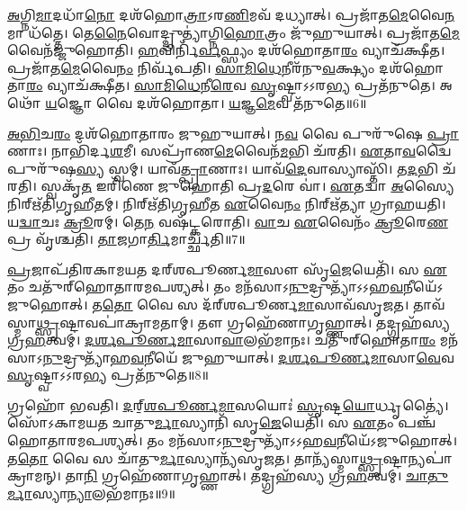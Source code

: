 \-\ul{𑌅}\-𑌗𑍍𑌨𑌿\-\ul{𑌮𑌾}\-𑌦𑌧𑌾᳴\-\ul{𑌨𑍋} 𑌦𑌶᳴𑌹𑍋\-\ul{𑌤𑍍𑌰𑌾}\-\-𑌽𑌰\-\ul{𑌣𑌿}\-𑌮𑌵᳴ 𑌦𑌧𑍍𑌯𑌾𑌤𑍍।
𑌪𑍍𑌰𑌜𑌾᳴𑌤\-\ul{𑌮𑍇}\-𑌵𑍈\-\ul{𑌨}\-𑌮𑌾 𑌧᳴𑌤𑍍𑌤𑍇।
𑌤𑍇\-\ul{𑌨𑍈}\-𑌵𑍋𑌦𑍍𑌦𑍍𑌰𑍁𑌤𑍍𑌯𑌾॑𑌗𑍍𑌨𑌿\-\ul{𑌹𑍋}\-𑌤𑍍𑌰𑌂 𑌜𑍁᳴𑌹𑍁𑌯𑌾𑌤𑍍।
𑌪𑍍𑌰𑌜𑌾᳴𑌤\-\ul{𑌮𑍇}\-𑌵𑍈𑌨᳴𑌜𑍍𑌜𑍁𑌹𑍋𑌤𑌿।
\-\ul{𑌹}\-𑌵𑌿𑌰𑍍𑌨𑌿᳴\-\ul{𑌰𑍍𑌵}\-𑌫𑍍𑌸𑍍𑌯𑌂 𑌦𑌶᳴𑌹𑍋𑌤𑌾\-\ul{𑌰𑌂} 𑌵𑍍𑌯𑌾𑌚᳴𑌕𑍍𑌷𑍀𑌤।
𑌪𑍍𑌰𑌜𑌾᳴𑌤\-\ul{𑌮𑍇}\-𑌵𑍈\-\ul{𑌨𑌂} 𑌨𑌿𑌰𑍍𑌵᳴𑌪𑌤𑌿।
\-\ul{𑌸𑌾}\-\-\ul{𑌮𑌿}\-\-\ul{𑌧𑍇}\-𑌨𑍀𑌰᳴𑌨𑍁\-\ul{𑌵}\-𑌕𑍍𑌷𑍍𑌯𑌂 𑌦𑌶᳴𑌹𑍋𑌤𑌾\-\ul{𑌰𑌂} 𑌵𑍍𑌯𑌾𑌚᳴𑌕𑍍𑌷𑍀𑌤।
\-\ul{𑌸𑌾}\-\-\ul{𑌮𑌿}\-\-\ul{𑌧𑍇}\-𑌨𑍀\-\ul{𑌰𑍇}\-𑌵 \ul{𑌸𑍃}\-𑌷𑍍𑌟𑍍𑌵𑌾\-𑌽𑌽𑌰\-\ul{𑌭𑍍𑌯} 𑌪𑍍𑌰𑌤᳴𑌨𑍁𑌤𑍇।
𑌅𑌥𑍋᳴ \ul{𑌯}\-𑌜𑍍𑌞𑍋 𑌵𑍈 𑌦𑌶᳴𑌹𑍋𑌤𑌾।
\-\ul{𑌯}\-𑌜𑍍𑌞\-\ul{𑌮𑍇}\-𑌵 𑌤᳴𑌨𑍁𑌤𑍇॥6॥

\-\ul{𑌅}\-\-\ul{𑌭𑌿}\-𑌚\-\ul{𑌰𑌂} 𑌦𑌶᳴𑌹𑍋𑌤𑌾𑌰𑌂 𑌜𑍁𑌹𑍁𑌯𑌾𑌤𑍍।
𑌨\-\ul{𑌵} 𑌵𑍈 𑌪𑍁𑌰𑍁᳴𑌷𑍇 \ul{𑌪𑍍𑌰𑌾}\-𑌣𑌾𑌃।
𑌨𑌾𑌭𑌿᳴𑌰𑍍𑌦\-\ul{𑌶}\-𑌮𑍀।
𑌸𑌪𑍍𑌰𑌾᳴𑌣\-\ul{𑌮𑍇}\-𑌵𑍈𑌨᳴\-\ul{𑌮}\-𑌭𑌿 𑌚᳴𑌰𑌤𑌿।
\-\ul{𑌏}\-𑌤𑌾\-\ul{𑌵}\-𑌦𑍍𑌵𑍈 𑌪𑍁𑌰𑍁᳴𑌷\-\ul{𑌸𑍍𑌯} 𑌸𑍍𑌵𑌮𑍍।
𑌯𑌾𑌵᳴\-\ul{𑌤𑍍𑌪𑍍𑌰𑌾}\-𑌣𑌾𑌃।
𑌯𑌾𑌵᳴\-\ul{𑌦𑍇}\-𑌵𑌾𑌸𑍍𑌯𑌾𑌸𑍍𑌤𑌿᳴।
𑌤\-\ul{𑌦}\-𑌭𑌿 𑌚᳴𑌰𑌤𑌿।
𑌸𑍍𑌵𑌕𑍃᳴\-\ul{𑌤} 𑌇𑌰𑌿᳴𑌣𑍇 𑌜𑍁𑌹𑍋𑌤𑌿 𑌪𑍍𑌰\-\ul{𑌦}\-𑌰𑍇 𑌵𑌾॑।
\-\ul{𑌏}\-𑌤𑌦𑍍𑌵𑌾 \ul{𑌅}\-𑌸𑍍𑌯𑍈 𑌨𑌿𑌰𑍍‌\mbox{}𑌋᳴𑌤𑌿𑌗𑍃𑌹𑍀𑌤𑌮𑍍।
𑌨𑌿𑌰𑍍‌\mbox{}𑌋᳴𑌤𑌿𑌗𑍃𑌹𑍀𑌤 \ul{𑌏}\-𑌵𑍈\-\ul{𑌨𑌂} 𑌨𑌿𑌰𑍍‌\mbox{}𑌋᳴𑌤𑍍𑌯𑌾 𑌗𑍍𑌰𑌾𑌹𑌯𑌤𑌿।
𑌯\-\ul{𑌦𑍍𑌵𑌾}\-𑌚𑌃 \ul{𑌕𑍍𑌰𑍂}\-𑌰𑌮𑍍।
𑌤𑍇\-\ul{𑌨} 𑌵𑌷᳴𑌟𑍍𑌕𑌰𑍋𑌤𑌿।
\-\ul{𑌵𑌾}\-𑌚 \ul{𑌏}\-𑌵𑍈𑌨𑌂᳴ \ul{𑌕𑍍𑌰𑍂}\-𑌰𑍇\-\ul{𑌣} 𑌪𑍍𑌰 𑌵𑍃᳴𑌶𑍍𑌚𑌤𑌿।
\-\ul{𑌤𑌾}\-𑌜𑌗𑌾\-\ul{𑌰𑍍𑌤𑌿}\-𑌮𑌾𑌰𑍍𑌚𑍍𑌛᳴𑌤𑌿॥7॥\anuvakamend[𑌦𑌶᳴𑌹𑍋\-\ul{𑌤𑌾} 𑌸𑍃𑌷𑍍𑌟𑍍𑌯𑌾᳴ \ul{𑌋}\-𑌚𑍍𑌛𑍇𑌦𑍍𑌵𑍍𑌯𑌾𑌚᳴𑌪𑍍𑌟𑍇 𑌰𑍁𑌨𑍍𑌧 \ul{𑌏}\-𑌵 𑌤᳴𑌨𑍁\-\ul{𑌤𑍇} 𑌨𑌿𑌰𑍍‌\mbox{}𑌋᳴𑌤𑌿𑌗𑍃𑌹𑍀\-\ul{𑌤𑌂} 𑌪𑌞𑍍𑌚᳴ 𑌚]

\-\ul{𑌪𑍍𑌰}\-𑌜𑌾𑌪᳴𑌤𑌿𑌰𑌕𑌾𑌮𑌯𑌤 𑌦𑌰𑍍‌\mbox{}𑌶𑌪𑍂𑌰𑍍𑌣\-\ul{𑌮𑌾}\-𑌸𑍗 𑌸𑍃᳴\-\ul{𑌜𑍇}\-𑌯𑍇𑌤𑌿᳴।
𑌸 \ul{𑌏}\-𑌤𑌂  𑌚𑌤𑍁᳴𑌰𑍍‌\mbox{}𑌹𑍋𑌤𑌾𑌰𑌮𑌪𑌶𑍍𑌯𑌤𑍍।
𑌤𑌂 𑌮𑌨᳴𑌸𑌾\-𑌽\-\ul{𑌨𑍁}\-𑌦𑍍𑌰𑍁𑌤𑍍𑌯𑌾᳴\-𑌽𑌽𑌹\-\ul{𑌵}\-𑌨𑍀𑌯𑍇᳴\-𑌽𑌜𑍁𑌹𑍋𑌤𑍍।
𑌤\-\ul{𑌤𑍋} 𑌵𑍈 𑌸 𑌦᳴𑌰𑍍‌\mbox{}𑌶𑌪𑍂𑌰𑍍𑌣\-\ul{𑌮𑌾}\-𑌸𑌾𑌵᳴\-𑌸𑍃𑌜𑌤।
𑌤𑌾𑌵᳴𑌸𑍍𑌮𑌾\-\ul{𑌥𑍍𑌸𑍃}\-𑌷𑍍𑌟𑌾𑌵𑌪𑌾॑\-𑌕𑍍𑌰𑌾𑌮𑌤𑌾𑌮𑍍।
𑌤𑍗 𑌗𑍍𑌰𑌹𑍇᳴𑌣𑌾𑌗𑍃𑌹𑍍𑌣𑌾𑌤𑍍।
𑌤𑌦𑍍𑌗𑍍𑌰𑌹᳴𑌸𑍍𑌯 𑌗𑍍𑌰\-\ul{𑌹}\-𑌤𑍍𑌵𑌮𑍍।
\-\ul{𑌦}\-\-\ul{𑌰𑍍𑌶}\-\-\ul{𑌪𑍂}\-\-\ul{𑌰𑍍𑌣}\-\-\ul{𑌮𑌾}\-𑌸𑌾\-\ul{𑌵𑌾}\-𑌲𑌭᳴𑌮𑌾𑌨𑌃।
𑌚𑌤𑍁᳴𑌰𑍍‌\mbox{}𑌹𑍋𑌤𑌾\-\ul{𑌰𑌂} 𑌮𑌨᳴𑌸𑌾\-𑌽\-\ul{𑌨𑍁}\-𑌦𑍍𑌰𑍁𑌤𑍍𑌯𑌾᳴\-𑌹\-\ul{𑌵}\-𑌨𑍀𑌯𑍇᳴ 𑌜𑍁𑌹𑍁𑌯𑌾𑌤𑍍।
\-\ul{𑌦}\-\-\ul{𑌰𑍍𑌶}\-\-\ul{𑌪𑍂}\-\-\ul{𑌰𑍍𑌣}\-\-\ul{𑌮𑌾}\-𑌸𑌾\-\ul{𑌵𑍇}\-𑌵 \ul{𑌸𑍃}\-𑌷𑍍𑌟𑍍𑌵𑌾\-𑌽𑌽𑌰\-\ul{𑌭𑍍𑌯} 𑌪𑍍𑌰𑌤᳴𑌨𑍁𑌤𑍇॥8॥

𑌗𑍍𑌰𑌹𑍋᳴ 𑌭𑌵𑌤𑌿।
\-\ul{𑌦}\-𑌰𑍍‌॒\mbox{}\-\ul{𑌶}\-\-\ul{𑌪𑍂}\-\-\ul{𑌰𑍍𑌣}\-\-\ul{𑌮𑌾}\-𑌸𑌯𑍋𑌃॑ \ul{𑌸𑍃}\-𑌷𑍍𑌟\-\ul{𑌯𑍋}\-𑌰𑍍𑌧𑍃𑌤𑍍𑌯𑍈॑।
𑌸𑍋᳴𑌽𑌕𑌾𑌮𑌯𑌤 𑌚𑌾𑌤𑍁\-\ul{𑌰𑍍𑌮𑌾}\-𑌸𑍍𑌯𑌾𑌨𑌿᳴ 𑌸𑍃\-\ul{𑌜𑍇}\-𑌯𑍇𑌤𑌿᳴।
𑌸 \ul{𑌏}\-𑌤𑌂 𑌪𑌞𑍍𑌚᳴𑌹𑍋𑌤𑌾𑌰𑌮𑌪𑌶𑍍𑌯𑌤𑍍।
𑌤𑌂 𑌮𑌨᳴𑌸𑌾\-𑌽\-\ul{𑌨𑍁}\-𑌦𑍍𑌰𑍁𑌤𑍍𑌯𑌾᳴\-𑌽𑌽𑌹\-\ul{𑌵}\-𑌨𑍀𑌯𑍇᳴\-𑌽𑌜𑍁𑌹𑍋𑌤𑍍।
𑌤\-\ul{𑌤𑍋} 𑌵𑍈 𑌸 𑌚𑌾᳴𑌤𑍁\-\ul{𑌰𑍍𑌮𑌾}\-𑌸𑍍𑌯𑌾𑌨𑍍𑌯᳴\-𑌸𑍃𑌜𑌤।
𑌤𑌾𑌨𑍍𑌯᳴𑌸𑍍𑌮𑌾\-\ul{𑌥𑍍𑌸𑍃}\-𑌷𑍍𑌟𑌾𑌨𑍍𑌯𑌪𑌾॑𑌕𑍍𑌰𑌾𑌮𑌨𑍍।
𑌤𑌾\-\ul{𑌨𑌿} 𑌗𑍍𑌰𑌹𑍇᳴𑌣𑌾𑌗𑍃𑌹𑍍𑌣𑌾𑌤𑍍।
𑌤𑌦𑍍𑌗𑍍𑌰𑌹᳴𑌸𑍍𑌯 𑌗𑍍𑌰\-\ul{𑌹}\-𑌤𑍍𑌵𑌮𑍍।
\-\ul{𑌚𑌾}\-\-\ul{𑌤𑍁}\-\-\ul{𑌰𑍍𑌮𑌾}\-𑌸𑍍𑌯𑌾\-\ul{𑌨𑍍𑌯𑌾}\-𑌲𑌭᳴𑌮𑌾𑌨𑌃॥9॥

